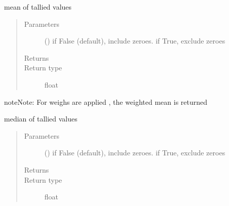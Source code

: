 \documentclass[letterpaper,10pt,english]{sphinxmanual}
\begin{document}
\begin{fulllineitems}
\begin{fulllineitems}
\begin{quote}
\begin{description}
\end{description}\end{quote}

\end{fulllineitems}


\begin{fulllineitems}
\label{\detokenize{Reference:salabim.Monitor.mean}}
mean of tallied values
\begin{quote}\begin{description}
\item[{Parameters}] \leavevmode
{} () \textendash{} if False (default), include zeroes. if True, exclude zeroes

\item[{Returns}] \leavevmode
{}

\item[{Return type}] \leavevmode
float

\end{description}\end{quote}

\begin{sphinxadmonition}{note}{Note:}
For weighs are applied , the weighted mean is returned
\end{sphinxadmonition}

\end{fulllineitems}


\begin{fulllineitems}
\label{\detokenize{Reference:salabim.Monitor.median}}
median of tallied values
\begin{quote}\begin{description}
\item[{Parameters}] \leavevmode
{} () \textendash{} if False (default), include zeroes. if True, exclude zeroes

\item[{Returns}] \leavevmode
{}

\item[{Return type}] \leavevmode
float

\end{description}\end{quote}


\end{fulllineitems}
\end{fulllineitems}
\end{document}
